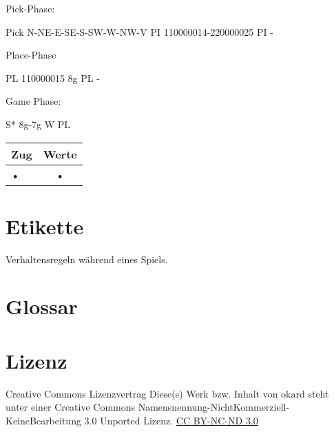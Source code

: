 \documentclass{article}
\begin{document}
Pick-Phase:

Pick N-NE-E-SE-S-SW-W-NW-V
PI 110000014-220000025
PI - 

Place-Phase
 
PL 110000015 8g
PL -

Game Phase:

S* 8g-7g
W 
PL

\begin{tabular}{|l|c||}
\hline Zug & Werte \\ \hline
• & • \\  
\end{tabular} 


\section{Etikette}
	Verhaltensregeln während eines Spiels.
	
	

\section{Glossar}

\section{Lizenz}
Creative Commons Lizenzvertrag
Diese(s) Werk bzw. Inhalt von okard steht unter einer Creative Commons Namensnennung-NichtKommerziell-KeineBearbeitung 3.0 Unported Lizenz.
\href{http://creativecommons.org/licenses/by-nc-nd/3.0/}{CC BY-NC-ND 3.0}
\end{document}
